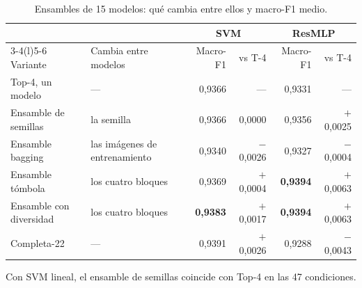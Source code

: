 \documentclass[11pt,a4paper]{article}
\newcommand{\pos}[1]{\textcolor{bien}{$+$#1}}
\newcommand{\negv}[1]{\textcolor{mal}{$-$#1}}
\begin{document}
\begin{table}[H]
\centering
\caption{Ensambles de 15 modelos: qué cambia entre ellos y macro-F1 medio.}
\label{tab:control}
\small
\begin{tabular}{@{}llrrrr@{}}
\toprule
 & & \multicolumn{2}{c}{SVM} & \multicolumn{2}{c}{ResMLP} \\
\cmidrule(lr){3-4}\cmidrule(l){5-6}
Variante & Cambia entre modelos & Macro-F1 & vs T-4 & Macro-F1 & vs T-4 \\
\midrule
Top-4, un modelo & --- & 0,9366 & --- & 0,9331 & --- \\
\addlinespace
Ensamble de semillas & la semilla & 0,9366 & 0,0000 & 0,9356 & \pos{0,0025} \\
Ensamble bagging & las imágenes de entrenamiento & 0,9340 & \negv{0,0026} & 0,9327 & \negv{0,0004} \\
\addlinespace
Ensamble tómbola & los cuatro bloques & 0,9369 & \pos{0,0004} & \textbf{0,9394} & \pos{0,0063} \\
\rowcolor{resalte} Ensamble con diversidad & los cuatro bloques & \textbf{0,9383} & \pos{0,0017} & \textbf{0,9394} & \pos{0,0063} \\
\midrule
Completa-22 & --- & 0,9391 & \pos{0,0026} & 0,9288 & \negv{0,0043} \\
\bottomrule
\end{tabular}

\smallskip
\footnotesize Con SVM lineal, el ensamble de semillas coincide con Top-4 en las
47 condiciones.
\end{table}
\end{document}
